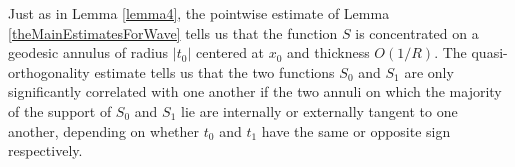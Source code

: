 
\begin{remark}
    Just as in Lemma \ref{lemma4}, the pointwise estimate of Lemma \ref{theMainEstimatesForWave} tells us that the function $S$ is concentrated on a geodesic annulus of radius $|t_0|$ centered at $x_0$ and thickness $O(1/R)$. %
The quasi-orthogonality estimate tells us that the two functions $S_0$ and $S_1$ are only significantly correlated with one another if the two annuli on which the majority of the support of $S_0$ and $S_1$ lie are internally or externally tangent to one another, depending on whether $t_0$ and $t_1$ have the same or opposite sign respectively. %
%
%
\end{remark}



